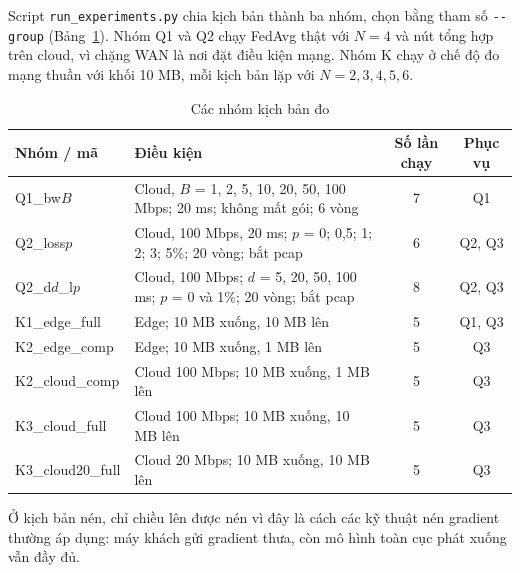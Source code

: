 Script \texttt{run\_experiments.py} chia kịch bản thành ba nhóm, chọn bằng tham số \texttt{-{}-group} (Bảng~\ref{tab:scen}). Nhóm Q1 và Q2 chạy FedAvg thật với $N = 4$ và nút tổng hợp trên cloud, vì chặng WAN là nơi đặt điều kiện mạng. Nhóm K chạy ở chế độ đo mạng thuần với khối 10 MB, mỗi kịch bản lặp với $N = 2, 3, 4, 5, 6$.

\begin{table}[H]
    \centering
    \caption{Các nhóm kịch bản đo}
    \label{tab:scen}
    \small
    \begin{tabularx}{\textwidth}{>{\raggedright\arraybackslash}p{3.3cm} >{\raggedright\arraybackslash}X c c}
        \toprule
        \textbf{Nhóm / mã} & \textbf{Điều kiện} & \textbf{Số lần chạy} & \textbf{Phục vụ} \\
        \midrule
        Q1\_bw$B$ & Cloud, $B$ = 1, 2, 5, 10, 20, 50, 100 Mbps; 20 ms; không mất gói; 6 vòng & 7 & Q1 \\
        \midrule
        Q2\_loss$p$ & Cloud, 100 Mbps, 20 ms; $p$ = 0; 0{,}5; 1; 2; 3; 5\%; 20 vòng; bắt pcap & 6 & Q2, Q3 \\
        \midrule
        Q2\_d$d$\_l$p$ & Cloud, 100 Mbps; $d$ = 5, 20, 50, 100 ms; $p$ = 0 và 1\%; 20 vòng; bắt pcap & 8 & Q2, Q3 \\
        \midrule
        K1\_edge\_full & Edge; 10 MB xuống, 10 MB lên & 5 & Q1, Q3 \\
        K2\_edge\_comp & Edge; 10 MB xuống, 1 MB lên & 5 & Q3 \\
        K2\_cloud\_comp & Cloud 100 Mbps; 10 MB xuống, 1 MB lên & 5 & Q3 \\
        K3\_cloud\_full & Cloud 100 Mbps; 10 MB xuống, 10 MB lên & 5 & Q3 \\
        K3\_cloud20\_full & Cloud 20 Mbps; 10 MB xuống, 10 MB lên & 5 & Q3 \\
        \bottomrule
    \end{tabularx}
\end{table}

Ở kịch bản nén, chỉ chiều lên được nén vì đây là cách các kỹ thuật nén gradient thường áp dụng: máy khách gửi gradient thưa, còn mô hình toàn cục phát xuống vẫn đầy đủ.


